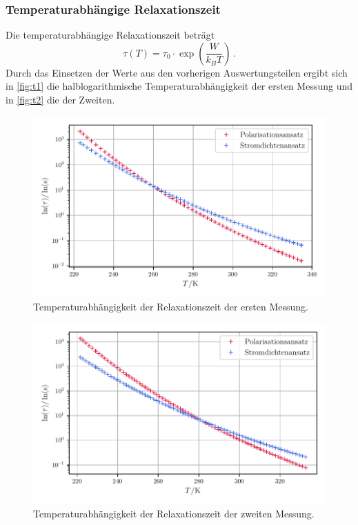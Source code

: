 \subsubsection{Temperaturabhängige Relaxationszeit}
Die temperaturabhängige Relaxationszeit beträgt
\begin{equation}
    \tau(T) = \tau_0 \cdot \exp\left(\frac{W}{k_B T}\right)\, . 
\end{equation}
Durch das Einsetzen der Werte aus den vorherigen Auswertungsteilen ergibt sich in \autoref{fig:t1} die halblogarithmische Temperaturabhängigkeit der ersten Messung und
in \autoref{fig:t2} die der Zweiten.
\begin{figure}
    \centering
    \includegraphics[width=0.8\linewidth]{scripts/build/plot1_t.pdf}
    \caption{Temperaturabhängigkeit der Relaxationszeit der ersten Messung.}
    \label{fig:t1}
\end{figure}
\begin{figure}
    \centering
    \includegraphics[width=0.8\linewidth]{scripts/build/plot2_t.pdf}
    \caption{Temperaturabhängigkeit der Relaxationszeit der zweiten Messung.}
    \label{fig:t2}
\end{figure}